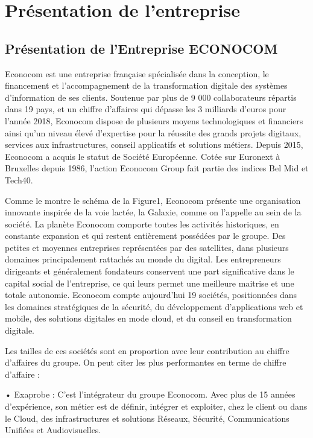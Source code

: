 \chapter{Présentation de l'entreprise}
\minitoc
\newpage
 
\section{Présentation de l'Entreprise ECONOCOM}
Econocom est une entreprise française spécialisée dans la conception, le financement
et l’accompagnement de la transformation digitale des systèmes d’information de ses clients.
Soutenue par plus de 9 000 collaborateurs répartis dans 19 pays, et un chiffre d’affaires qui
dépasse les 3 milliards d’euros pour l’année 2018, Econocom dispose de plusieurs moyens
technologiques et financiers ainsi qu’un niveau élevé d’expertise pour la réussite des grands
projets digitaux, services aux infrastructures, conseil applicatifs et solutions métiers.
Depuis 2015, Econocom a acquis le statut de Société Européenne. Cotée sur Euronext
à Bruxelles depuis 1986, l’action Econocom Group fait partie des indices Bel Mid et Tech40.




Comme le montre le schéma de la Figure1, Econocom présente une organisation
innovante inspirée de la voie lactée, la Galaxie, comme on l’appelle au sein de la société. La planète Econocom comporte toutes les activités historiques, en constante expansion et qui restent entièrement possédées par le groupe. Des petites et moyennes entreprises représentées par des satellites, dans plusieurs domaines principalement rattachés au monde du digital. Les entrepreneurs dirigeants et généralement fondateurs conservent une part significative dans le capital social de l’entreprise, ce qui leurs permet une meilleure maitrise et une totale autonomie. Econocom compte aujourd’hui 19 sociétés, positionnées dans les domaines stratégiques de la sécurité, du développement d’applications web et mobile, des solutions digitales en mode cloud, et du conseil en transformation digitale.

Les tailles de ces sociétés sont en proportion avec leur contribution au chiffre
d’affaires du groupe. On peut citer les plus performantes en terme de chiffre d’affaire :

•   Exaprobe : C’est l’intégrateur du groupe Econocom. Avec plus de 15 années  
d’expérience, son métier est de définir, intégrer et exploiter, chez le client ou dans le Cloud, des infrastructures et solutions Réseaux, Sécurité, Communications Unifiées et Audiovisuelles.

